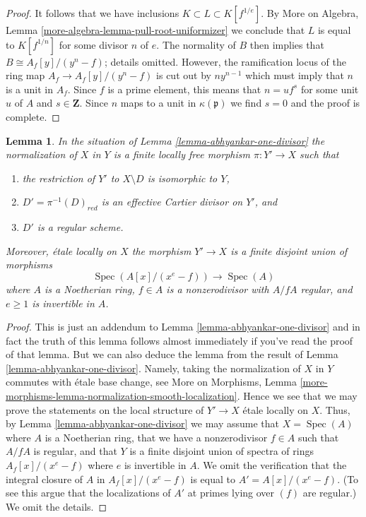 \documentclass{stacks-project}
\theoremstyle{plain}
\newtheorem{lemma}[subsection]{Lemma}
\theoremstyle{definition}
\theoremstyle{remark}
\numberwithin{equation}{subsection}
\def\Spec{\mathop{\mathrm{Spec}}}
\begin{document}
\begin{proof}
\medskip\noindent
It follows that we have inclusions $K \subset L \subset K[f^{1/e}]$.
By More on Algebra, Lemma \ref{more-algebra-lemma-pull-root-uniformizer}
we conclude that $L$ is equal to $K[f^{1/n}]$ for some divisor $n$ of $e$.
The normality of $B$ then implies that $B \cong A_f[y]/(y^n - f)$; details
omitted.
However, the ramification locus of the ring map $A_f \to A_f[y]/(y^n - f)$
is cut out by $ny^{n - 1}$ which must imply that $n$ is a unit in $A_f$.
Since $f$ is a prime element, this means that $n = u f^s$ for
some unit $u$ of $A$ and $s \in \mathbf{Z}$. Since $n$ maps to a unit in
$\kappa(\mathfrak p)$ we find $s = 0$ and the proof is complete.
\end{proof}

\begin{lemma}
\label{lemma-extend-tame-covering-normal}
In the situation of Lemma \ref{lemma-abhyankar-one-divisor}
the normalization of $X$ in $Y$ is a finite locally free morphism
$\pi : Y' \to X$ such that
\begin{enumerate}
\item the restriction of $Y'$ to $X \setminus D$ is isomorphic to $Y$,
\item $D' = \pi^{-1}(D)_{red}$ is an effective Cartier divisor on $Y'$, and
\item $D'$ is a regular scheme.
\end{enumerate}
Moreover, \'etale locally on $X$ the morphism $Y' \to X$ is a finite disjoint
union of morphisms
$$
\Spec(A[x]/(x^e - f)) \to \Spec(A)
$$
where $A$ is a Noetherian ring, $f \in A$ is a nonzerodivisor with
$A/fA$ regular, and $e \geq 1$ is invertible in $A$.
\end{lemma}

\begin{proof}
This is just an addendum to Lemma \ref{lemma-abhyankar-one-divisor}
and in fact the truth of this lemma follows almost immediately if
you've read the proof of that lemma. But we can also deduce
the lemma from the result of Lemma \ref{lemma-abhyankar-one-divisor}.
Namely, taking the normalization of $X$ in $Y$ commutes with
\'etale base change, see More on Morphisms, Lemma
\ref{more-morphisms-lemma-normalization-smooth-localization}.
Hence we see that we may prove the statements on the local structure
of $Y' \to X$ \'etale locally on $X$. Thus, by
Lemma \ref{lemma-abhyankar-one-divisor} we may assume that
$X = \Spec(A)$ where $A$ is a Noetherian ring, that we have a
nonzerodivisor $f\in A$ such that $A/fA$ is regular, and that $Y$
is a finite disjoint union of spectra of rings $A_f[x]/(x^e - f)$
where $e$ is invertible in $A$. We omit the verification that
the integral closure of $A$ in $A_f[x]/(x^e - f)$ is
equal to $A' = A[x]/(x^e - f)$. (To see this argue that
the localizations of $A'$ at primes lying over $(f)$ are regular.)
We omit the details.
\end{proof}
\end{document}
